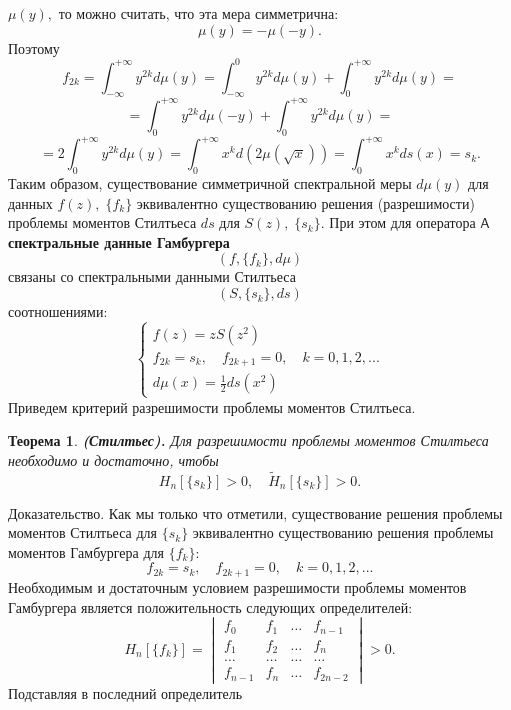 \documentclass[12pt,a4paper]{article}
\theoremstyle{plain}   \newtheorem{Pro}{Задача}
\newtheorem{The}{Теорема}
\begin{document}
$ \mu (y) , $
то можно считать, что эта мера симметрична:
$$
  \mu (y)=-\mu (-y).
$$
Поэтому
$$
  f_{2k}=\int _{-\infty}^{+\infty}y^{2k}d\mu (y)=
    \int _{-\infty}^0 y^{2k}d\mu (y) +
	  \int _0 ^{+\infty} y^{2k}d\mu (y)=
$$
$$
  =\int _0 ^{+\infty}y^{2k}d\mu (-y) +
    \int _0 ^{+\infty} y^{2k}d\mu (y)=
$$
$$
  =2\int _0 ^{+\infty}y^{2k}d\mu (y) =
    \int _0 ^{+\infty}x^k d(2\mu (\sqrt{x}))=
	  \int _0 ^{+\infty}x^k ds(x)=s_k .
$$
Таким образом, существование симметричной спектральной меры
$ d\mu (y) $
для данных
$ f(z), \; \{ f_k \} $
эквивалентно существованию решения (разрешимости)
проблемы моментов Стилтьеса
$ ds $
для
$ S(z), \; \{ s_k \} . $
При этом для оператора
$ \mathsf{A} $
{\bfseries спектральные данные Гамбургера}
$$
  (f, \{ f_k \} , d\mu )
$$
связаны со спектральными данными Стилтьеса
$$
  (S,\{ s_k \} , ds)
$$
соотношениями:
\begin{equation*}
  \begin{cases}
    f(z)=zS(z^2 ) \\
	f_{2k}=s_k , \quad f_{2k+1}=0 , \quad k=0,1,2,... \\
	d\mu (x)=\frac{1}{2}ds(x^2 )
  \end{cases}
\end{equation*}
Приведем критерий разрешимости проблемы моментов Стилтьеса.
\begin{The}{\bfseries (Стилтьес).}
Для разрешимости проблемы моментов Стилтьеса
необходимо и достаточно, чтобы
$$
  H_n [\{ s_k \} ]>0, \quad
  \tilde H_n [ \{ s_k \} ] > 0.
$$
\end{The}
{\Large Доказательство.}
Как мы только что отметили, существование решения
проблемы моментов Стилтьеса для
$ \{ s_k \} $
эквивалентно существованию решения проблемы моментов
Гамбургера для
$ \{ f_k \} : $
$$
  f_{2k}=s_k , \quad f_{2k+1}=0, \quad k=0,1,2,...
$$
Необходимым и достаточным условием разрешимости проблемы
моментов Гамбургера является положительность следующих
определителей:
\begin{equation*}
  H_n [\{ f_k \} ]=
    \begin{vmatrix}
	  f_0 & f_1 & \dots & f_{n-1} \\
	  f_1 & f_2 & \dots & f_n \\
	  \dots & \dots & \dots & \dots \\
	  f_{n-1} & f_n & \dots & f_{2n-2}
	\end{vmatrix}
  >0.
\end{equation*}
Подставляя в последний определитель
\end{document}
